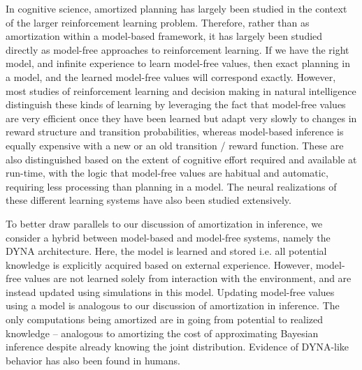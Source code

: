 In cognitive science, amortized planning has largely been studied in the context of the larger reinforcement learning problem. Therefore, rather than as amortization within a model-based framework, it has largely been studied directly as model-free approaches to reinforcement learning. If we have the right model, and infinite experience to learn model-free values, then exact planning in a model, and the learned model-free values will correspond exactly. However, most studies of reinforcement learning and decision making in natural intelligence distinguish these kinds of learning by leveraging the fact that model-free values are very efficient once they have been learned but adapt very slowly to changes in reward structure and transition probabilities, whereas model-based inference is equally expensive with a new or an old transition / reward function\citep{daw2011model}. These are also distinguished based on the extent of cognitive effort required and available at run-time, with the logic that model-free values are habitual and automatic, requiring less processing than planning in a model\citep{otto2014cognitive, kool2017cost}. The neural realizations of these different learning systems have also been studied extensively\citep{glascher2010states, o2003temporal}. 

To better draw parallels to our discussion of amortization in inference, we consider a hybrid between model-based and model-free systems, namely the DYNA architecture\citep{sutton1991dyna}. Here, the model is learned and stored i.e. all potential knowledge is explicitly acquired based on external experience. However, model-free values are not learned solely from interaction with the environment, and are instead updated using simulations in this model. Updating model-free values using a model is analogous to our discussion of amortization in inference. The only computations being amortized are in going from potential to realized knowledge -- analogous to amortizing the cost of approximating Bayesian inference despite already knowing the joint distribution. Evidence of DYNA-like behavior has also been found in humans\citep{gershman2014retrospective}.

